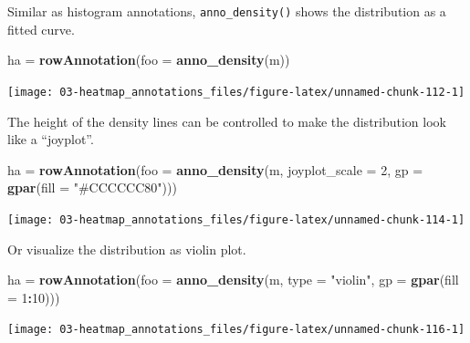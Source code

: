 \documentclass[]{book}
\newenvironment{Shaded}{\begin{snugshade}}{\end{snugshade}}
\newcommand{\KeywordTok}[1]{\textcolor[rgb]{0.13,0.29,0.53}{\textbf{#1}}}
\newcommand{\DataTypeTok}[1]{\textcolor[rgb]{0.13,0.29,0.53}{#1}}
\newcommand{\DecValTok}[1]{\textcolor[rgb]{0.00,0.00,0.81}{#1}}
\newcommand{\StringTok}[1]{\textcolor[rgb]{0.31,0.60,0.02}{#1}}
\newcommand{\OperatorTok}[1]{\textcolor[rgb]{0.81,0.36,0.00}{\textbf{#1}}}
\newcommand{\NormalTok}[1]{#1}
\theoremstyle{definition}
\theoremstyle{definition}
\theoremstyle{definition}
\theoremstyle{remark}
\begin{document}
Similar as histogram annotations, \texttt{anno\_density()} shows the
distribution as a fitted curve.

\begin{Shaded}
\begin{Highlighting}[]
\NormalTok{ha =}\StringTok{ }\KeywordTok{rowAnnotation}\NormalTok{(}\DataTypeTok{foo =} \KeywordTok{anno_density}\NormalTok{(m))}
\end{Highlighting}
\end{Shaded}

\begin{center}\texttt{[image: 03-heatmap\_annotations\_files/figure-latex/unnamed-chunk-112-1]} \end{center}

The height of the density lines can be controlled to make the
distribution look like a ``joyplot''.

\begin{Shaded}
\begin{Highlighting}[]
\NormalTok{ha =}\StringTok{ }\KeywordTok{rowAnnotation}\NormalTok{(}\DataTypeTok{foo =} \KeywordTok{anno_density}\NormalTok{(m, }\DataTypeTok{joyplot_scale =} \DecValTok{2}\NormalTok{, }
    \DataTypeTok{gp =} \KeywordTok{gpar}\NormalTok{(}\DataTypeTok{fill =} \StringTok{"#CCCCCC80"}\NormalTok{)))}
\end{Highlighting}
\end{Shaded}

\begin{center}\texttt{[image: 03-heatmap\_annotations\_files/figure-latex/unnamed-chunk-114-1]} \end{center}

Or visualize the distribution as violin plot.

\begin{Shaded}
\begin{Highlighting}[]
\NormalTok{ha =}\StringTok{ }\KeywordTok{rowAnnotation}\NormalTok{(}\DataTypeTok{foo =} \KeywordTok{anno_density}\NormalTok{(m, }\DataTypeTok{type =} \StringTok{"violin"}\NormalTok{, }
    \DataTypeTok{gp =} \KeywordTok{gpar}\NormalTok{(}\DataTypeTok{fill =} \DecValTok{1}\OperatorTok{:}\DecValTok{10}\NormalTok{)))}
\end{Highlighting}
\end{Shaded}

\begin{center}\texttt{[image: 03-heatmap\_annotations\_files/figure-latex/unnamed-chunk-116-1]} \end{center}
\end{document}
